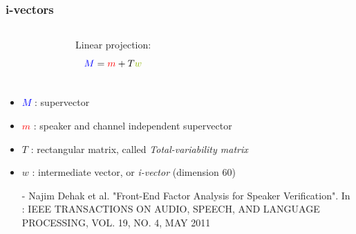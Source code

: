 \documentclass[11pt,english]{beamer}
\begin{document}
\begin{frame}
  \frametitle{i-vectors}
  \begin{columns}
    \begin{figure}
    
    \end{figure}
    
    
  	Linear projection:
    $$\textcolor{blue}{M} = \textcolor{red}{m} + T\textcolor{mygreen}{w}$$
    
    \\
  \end{columns}
    \vspace{1cm}
    \begin{itemize}
    \item \textcolor{blue}{$M$} : supervector
    \item \textcolor{red}{$m$} : speaker and channel independent supervector
    \item $T$ : rectangular matrix, called \emph{Total-variability matrix}
    \item \textcolor{mygreen}{$w$} : intermediate vector, or \emph{i-vector}
      (dimension 60)
    \end{itemize}
\begin{itemize}

  	 \item[-] \footnotesize Najim Dehak et al. "Front-End Factor Analysis for Speaker Verification". In : IEEE TRANSACTIONS ON AUDIO, SPEECH, AND LANGUAGE PROCESSING, VOL. 19, NO. 4, MAY 2011

\end{itemize}
\end{frame}
\end{document}
